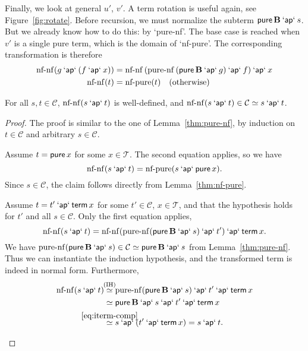 Finally, we look at general $u'$, $v'$.
A term rotation is useful again, see Figure~\ref{fig:rotate}.
Before recursion, we must normalize the subterm $\operatorname{\mathsf{pure}} \mathbf{B} \mathbin{\mathsf{`ap`}} s$.
But we already know how to do this: by `pure-nf'.
The base case is reached when $v'$ is a single pure term, which is the domain
of `nf-pure'.
The corresponding transformation is therefore
\begin{align}
	\operatorname{nf-nf}(g \mathbin{\mathsf{`ap`}} (f \mathbin{\mathsf{`ap`}} x)) &=
		\operatorname{nf-nf}{(\operatorname{pure-nf}{(\operatorname{\mathsf{pure}} \mathbf{B} \mathbin{\mathsf{`ap`}} g)} \mathbin{\mathsf{`ap`}} f)} \mathbin{\mathsf{`ap`}} x \label{eq:nf-nf1}\\
	\operatorname{nf-nf}(t) &= \operatorname{nf-pure}(t) \quad\text{(otherwise)}
\end{align}
\begin{lemma}\label{thm:nf-nf}
For all $s,t \in \mathcal{C}$,
$\operatorname{nf-nf}(s \mathbin{\mathsf{`ap`}} t)$ is well-defined, and
$\operatorname{nf-nf}(s \mathbin{\mathsf{`ap`}} t) \in \mathcal{C} \simeq s \mathbin{\mathsf{`ap`}} t$.
\end{lemma}
\begin{proof}
The proof is similar to the one of Lemma~\ref{thm:pure-nf}, by induction on
$t \in \mathcal{C}$ and arbitrary $s \in \mathcal{C}$.
\begin{prfcases}
\item Assume $t = \operatorname{\mathsf{pure}} x$ for some $x \in \mathcal{T}$.
	The second equation applies, so we have
	\[ \operatorname{nf-nf}(s \mathbin{\mathsf{`ap`}} t) = \operatorname{nf-pure}(s \mathbin{\mathsf{`ap`}} \operatorname{\mathsf{pure}} x). \]
	Since $s \in \mathcal{C}$, the claim follows directly from Lemma~\ref{thm:nf-pure}.
\item Assume $t = t' \mathbin{\mathsf{`ap`}} \operatorname{\mathsf{term}} x$ for some
	$t' \in \mathcal{C}$, $x \in \mathcal{T}$, and that the hypothesis holds
	for $t'$ and all $s \in \mathcal{C}$.
	Only the first equation applies,
	\[ \operatorname{nf-nf}(s \mathbin{\mathsf{`ap`}} t) =
		\operatorname{nf-nf} (\operatorname{pure-nf}(\operatorname{\mathsf{pure}} \mathbf{B} \mathbin{\mathsf{`ap`}} s) \mathbin{\mathsf{`ap`}} t') \mathbin{\mathsf{`ap`}} \operatorname{\mathsf{term}} x. \]
	We have
	$\operatorname{pure-nf}(\operatorname{\mathsf{pure}} \mathbf{B} \mathbin{\mathsf{`ap`}} s) \in \mathcal{C} \simeq \operatorname{\mathsf{pure}} \mathbf{B} \mathbin{\mathsf{`ap`}} s$
	from Lemma~\ref{thm:pure-nf}.
	Thus we can instantiate the induction hypothesis, and the transformed term
	is indeed in normal form.
	Furthermore,
	\begin{align*}
		\operatorname{nf-nf}(s \sap t) &\stackrel{\mathclap{\text{(IH)}}}{\simeq}
			\operatorname{pure-nf}(\spure \mathbf{B} \sap s) \sap t' \sap \sterm x \\
		&\simeq \spure \mathbf{B} \sap s \sap t' \sap \sterm x \\
		&\stackrel{\mathclap{\eqref{eq:iterm-comp}}}{\simeq}
			s \sap (t' \sap \sterm x) = s \sap t. \qedhere
	\end{align*}
\end{prfcases}
\end{proof}


